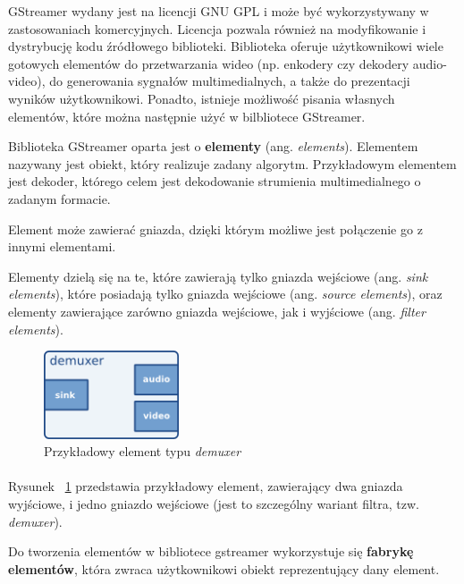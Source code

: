 \documentclass[12pt]{article}
\begin{document}
GStreamer wydany jest na licencji GNU GPL i może być wykorzystywany w zastosowaniach komercyjnych. Licencja pozwala również na modyfikowanie i dystrybucję kodu źródłowego biblioteki.
Biblioteka oferuje użytkownikowi wiele gotowych elementów do przetwarzania wideo (np. enkodery czy dekodery audio-video), do generowania sygnałów multimedialnych, a także do prezentacji wyników użytkownikowi. Ponadto, istnieje możliwość pisania własnych elementów, które można następnie użyć w bilbliotece GStreamer.

Biblioteka GStreamer oparta jest o \textbf{elementy} (ang. \textit{elements}). Elementem nazywany jest obiekt, który realizuje zadany algorytm. Przykładowym elementem jest dekoder, którego celem jest dekodowanie strumienia multimedialnego o zadanym formacie.

Element może zawierać gniazda, dzięki którym możliwe jest połączenie go z innymi elementami.

Elementy dzielą się na te, które zawierają tylko gniazda wejściowe (ang. \textit{sink elements}), które posiadają tylko gniazda wejściowe (ang. \textit{source elements}), oraz elementy zawierające zarówno gniazda wejściowe, jak i wyjściowe (ang. \textit{filter elements}).
\begin{figure}[H]
  \includegraphics[width=40mm]{img/sample-demuxer.png}
  \caption{Przykładowy element typu \textit{demuxer} \cite{gstmainpage}}
  \label{fig:sampleDemuxer}
\end{figure}
\paragraph{}
Rysunek ~\ref{fig:sampleDemuxer} przedstawia przykładowy element, zawierający dwa gniazda wyjściowe, i jedno gniazdo wejściowe (jest to szczególny wariant filtra, tzw. \textit{demuxer}).

Do tworzenia elementów w bibliotece gstreamer wykorzystuje się \textbf{fabrykę elementów}, która zwraca użytkownikowi obiekt reprezentujący dany element.
\end{document}
